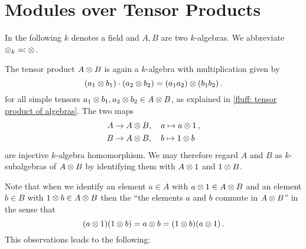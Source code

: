 \section{Modules over Tensor Products}


\begin{conventions}
  In the following $k$ denotes a field and $A, B$ are two $k$-algebras.
  We abbreviate $\mathbin{\otimes}_k \eqqcolon \mathbin{\otimes}$.
\end{conventions}


\begin{fluff}
  The tensor product $A \mathbin{\otimes} B$ is again a $k$-algebra with multiplication given by
  \[
      (a_1 \mathbin{\otimes} b_1) \cdot (a_2 \mathbin{\otimes} b_2)
    = (a_1 a_2) \mathbin{\otimes} (b_1 b_2) \,.
  \]
  for all simple tensors $a_1 \mathbin{\otimes} b_1, a_2 \mathbin{\otimes} b_2 \in A \mathbin{\otimes} B$, as explained in \ref{fluff: tensor product of algebras}.
  The two maps
  \begin{align*}
              A
      &\to    A \mathbin{\otimes} B,
      \quad   a
      \mapsto a \mathbin{\otimes} 1 \,,
  \\
              B
      &\to    A \mathbin{\otimes} B,
      \quad   b
      \mapsto 1 \mathbin{\otimes} b
  \end{align*}
  are injective $k$-algebra homomorphism.
  We may therefore regard $A$ and $B$ as $k$-subalgebras of $A \mathbin{\otimes} B$ by identifying them with $A \mathbin{\otimes} 1$ and $1 \mathbin{\otimes} B$.
  
  Note that when we identify an element $a \in A$ with $a \mathbin{\otimes} 1 \in A \mathbin{\otimes} B$ and an element $b \in B$ with $1 \mathbin{\otimes} b \in A \mathbin{\otimes} B$ then the \enquote{the elements $a$ and $b$ commute in $A \mathbin{\otimes} B$} in the sense that
  \[
      (a \mathbin{\otimes} 1)(1 \mathbin{\otimes} b)
    = a \mathbin{\otimes} b
    = (1 \mathbin{\otimes} b)(a \mathbin{\otimes} 1) \,.
  \]
  This observations leads to the following:
\end{fluff}


